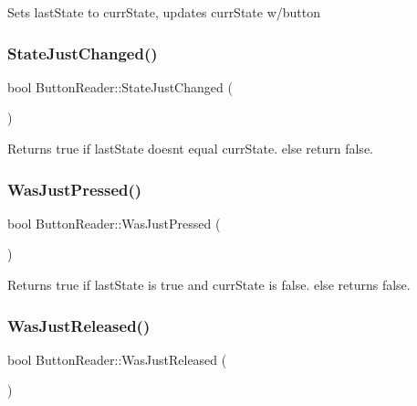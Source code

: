 Sets last\+State to curr\+State, updates curr\+State w/button \mbox{\label{class_button_reader_a2c19cae72a053bbba95f1c1a91735876}} 
\subsubsection{\texorpdfstring{State\+Just\+Changed()}{StateJustChanged()}}
{\footnotesize\ttfamily bool Button\+Reader\+::\+State\+Just\+Changed (\begin{DoxyParamCaption}{ }\end{DoxyParamCaption})}

\begin{DoxyReturn}{Returns}
true if last\+State doesn\textquotesingle{}t equal curr\+State. else return false. 
\end{DoxyReturn}
\mbox{\label{class_button_reader_ace4a07bf7f65418c026477b9d5ab1225}} 
\subsubsection{\texorpdfstring{Was\+Just\+Pressed()}{WasJustPressed()}}
{\footnotesize\ttfamily bool Button\+Reader\+::\+Was\+Just\+Pressed (\begin{DoxyParamCaption}{ }\end{DoxyParamCaption})}

\begin{DoxyReturn}{Returns}
true if last\+State is true and curr\+State is false. else returns false. 
\end{DoxyReturn}
\mbox{\label{class_button_reader_afded4de61711a165928fe0730d8743e7}} 
\subsubsection{\texorpdfstring{Was\+Just\+Released()}{WasJustReleased()}}
{\footnotesize\ttfamily bool Button\+Reader\+::\+Was\+Just\+Released (\begin{DoxyParamCaption}{ }\end{DoxyParamCaption})}

